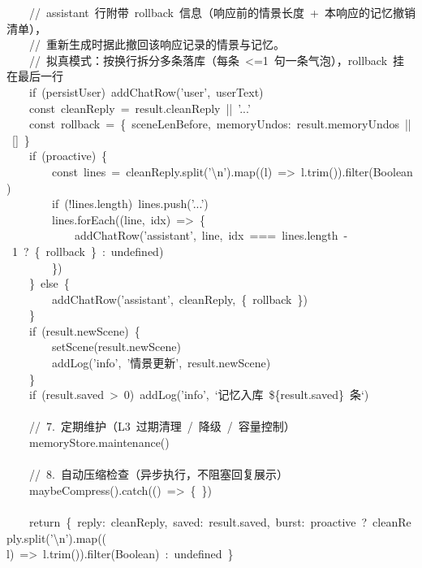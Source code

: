 \documentclass[a4paper,10pt]{article}
\begin{document}
{\ttfamily\footnotesize\raggedright
~~~~//~assistant~行附带~rollback~信息（响应前的情景长度~+~本响应的记忆撤销清单），\\
~~~~//~重新生成时据此撤回该响应记录的情景与记忆。\\
~~~~//~拟真模式：按换行拆分多条落库（每条~<=1~句一条气泡），rollback~挂在最后一行\\
~~~~if~(persistUser)~addChatRow('user',~userText)\\
~~~~const~cleanReply~=~result.cleanReply~||~'...'\\
~~~~const~rollback~=~\{~sceneLenBefore,~memoryUndos:~result.memoryUndos~||~[]~\}\\
~~~~if~(proactive)~\{\\
~~~~~~~~const~lines~=~cleanReply.split('\textbackslash{}n').map((l)~=>~l.trim()).filter(Boolean)\\
~~~~~~~~if~(!lines.length)~lines.push('...')\\
~~~~~~~~lines.forEach((line,~idx)~=>~\{\\
~~~~~~~~~~~~addChatRow('assistant',~line,~idx~===~lines.length~-~1~?~\{~rollback~\}~:~undefined)\\
~~~~~~~~\})\\
~~~~\}~else~\{\\
~~~~~~~~addChatRow('assistant',~cleanReply,~\{~rollback~\})\\
~~~~\}\\
~~~~if~(result.newScene)~\{\\
~~~~~~~~setScene(result.newScene)\\
~~~~~~~~addLog('info',~'情景更新',~result.newScene)\\
~~~~\}\\
~~~~if~(result.saved~>~0)~addLog('info',~`记忆入库~\$\{result.saved\}~条`)\\
\mbox{}\\
~~~~//~7.~定期维护（L3~过期清理~/~降级~/~容量控制）\\
~~~~memoryStore.maintenance()\\
\mbox{}\\
~~~~//~8.~自动压缩检查（异步执行，不阻塞回复展示）\\
~~~~maybeCompress().catch(()~=>~\{~\})\\
\mbox{}\\
~~~~return~\{~reply:~cleanReply,~saved:~result.saved,~burst:~proactive~?~cleanReply.split('\textbackslash{}n').map((\\
l)~=>~l.trim()).filter(Boolean)~:~undefined~\}\\
}
\end{document}

